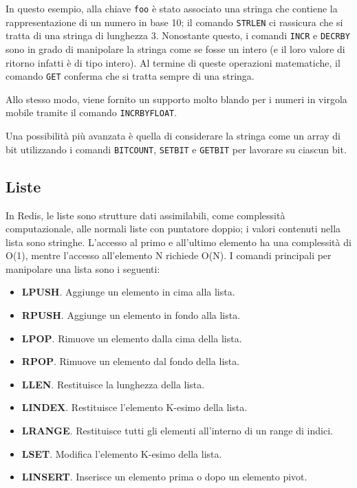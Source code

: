 In questo esempio, alla chiave \verb|foo| è stato associato una stringa che contiene
la rappresentazione di un numero in base 10; il comando \verb|STRLEN| ci rassicura
che si tratta di una stringa di lunghezza 3. Nonostante questo, i comandi \verb|INCR|
e \verb|DECRBY| sono in grado di manipolare la stringa come se fosse un intero (e il
loro valore di ritorno infatti è di tipo intero). Al termine di queste operazioni
matematiche, il comando \verb|GET| conferma che si tratta sempre di una stringa.

Allo stesso modo, viene fornito un supporto molto blando per i numeri in virgola
mobile tramite il comando \verb|INCRBYFLOAT|.

Una possibilità più avanzata è quella di considerare la stringa come un array di bit
utilizzando i comandi \verb|BITCOUNT|, \verb|SETBIT| e \verb|GETBIT| per lavorare
su ciascun bit.

\subsection{Liste}

In Redis, le liste sono strutture dati assimilabili, come complessità computazionale,
alle normali liste con puntatore doppio; i valori contenuti nella lista sono stringhe.
L'accesso al primo e all'ultimo elemento ha una complessità di O(1), mentre
l'accesso all'elemento N richiede O(N). I comandi principali per manipolare una
lista sono i seguenti:

\begin{itemize}
	\medskip
	\item \textbf{LPUSH}. Aggiunge un elemento in cima alla lista.
	\item \textbf{RPUSH}. Aggiunge un elemento in fondo alla lista.
	\item \textbf{LPOP}. Rimuove un elemento dalla cima della lista.
	\item \textbf{RPOP}. Rimuove un elemento dal fondo della lista.
	\item \textbf{LLEN}. Restituisce la lunghezza della lista.
	\item \textbf{LINDEX}. Restituisce l'elemento K-esimo della lista.
	\item \textbf{LRANGE}. Restituisce tutti gli elementi all'interno di un range di indici.
	\item \textbf{LSET}. Modifica l'elemento K-esimo della lista.
	\item \textbf{LINSERT}. Inserisce un elemento prima o dopo un elemento pivot.
\end{itemize}

